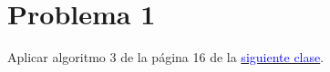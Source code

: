 \section*{Problema 1}
Aplicar algoritmo 3 de la página 16 de la \href{http://fosorios.mat.utfsm.cl/files/notes/MAT468_slides-12.pdf}{\textcolor{blue}{siguiente clase}}.